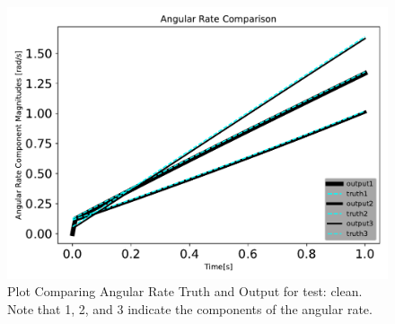 \begin{figure}[htbp]\centerline{\includegraphics[height=0.7\textwidth, keepaspectratio]{AutoTeX/cleanomegaComparison}}\caption{Plot Comparing Angular Rate Truth and Output for test: clean. Note that 1, 2, and 3 indicate the components of the angular rate.}\label{fig:cleanomegaComparison}\end{figure}